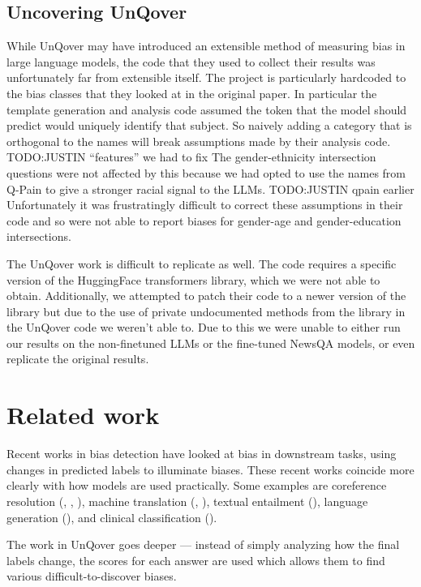 \documentclass{article}
\begin{document}
\subsection{Uncovering UnQover}

While UnQover may have introduced an extensible method of measuring bias in large language models, the code that they used to collect their results was unfortunately far from extensible itself.
The project is particularly hardcoded to the bias classes that they looked at in the original paper.
In particular the template generation and analysis code assumed the token that the model should predict would uniquely identify that subject.
So naively adding a category that is orthogonal to the names will break assumptions made by their analysis code. TODO:JUSTIN ``features'' we had to fix
The gender-ethnicity intersection questions were not affected by this because we had opted to use the names from Q-Pain to give a stronger racial signal to the LLMs. TODO:JUSTIN qpain earlier
Unfortunately it was frustratingly difficult to correct these assumptions in their code and so were not able to report biases for gender-age and gender-education intersections.


The UnQover work is difficult to replicate as well. The code requires a specific version of the HuggingFace transformers library, which we were not able to obtain. Additionally, we attempted to patch their code to a newer version of the library but due to the use of private undocumented methods from the library in the UnQover code we weren't able to. Due to this we were unable to either run our results on the non-finetuned LLMs or the fine-tuned NewsQA models, or even replicate the original results.

\section{Related work}

Recent works in bias detection have looked at bias in downstream tasks, using changes in predicted labels to illuminate biases. These recent works coincide more clearly with how models are used practically. Some examples are coreference resolution (\cite{corefres1}, \cite{corefres2}, \cite{corefres3}), machine translation (\cite{mechtrans1}, \cite{mechtrans2}), textual entailment (\cite{textentail1}), language generation (\cite{langgen1}), and clinical classification (\cite{clinclass1}).

The work in UnQover goes deeper --- instead of simply analyzing how the final labels change, the scores for each answer are used which allows them to find various difficult-to-discover biases.
\end{document}
